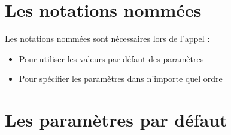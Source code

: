 \documentclass[10pt]{beamer}
\begin{document}
\section{Les notations nommées}

\begin{frame}{\secname}
    Les notations nommées sont nécessaires lors de l'appel :
    \begin{itemize}
        \item Pour utiliser les valeurs par défaut des paramètres
        \item Pour spécifier les paramètres dans n'importe quel ordre
    \end{itemize}
\end{frame}

\begin{frame}{\secname}
    
\end{frame}

\section{Les paramètres par défaut}

\begin{frame}{\secname}
    
\end{frame}
\end{document}
